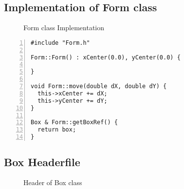 \documentclass{article}
\begin{document}
\subsection{Implementation of Form class}
\begin{figure}
  \scriptsize{\caption{Form class Implementation}}
\end{figure}

\begin{lstlisting}[basicstyle=\footnotesize\ttfamily, numbers=left, stepnumber=1, numberstyle = \normalsize]
#include "Form.h"

Form::Form() : xCenter(0.0), yCenter(0.0) {

}

void Form::move(double dX, double dY) {
  this->xCenter += dX;
  this->yCenter += dY;
}

Box & Form::getBoxRef() {
  return box;
}
\end{lstlisting}

\subsection{Box Headerfile}
\begin{figure}
  \scriptsize{\caption{Header of Box class}}
\end{figure}
\end{document}
